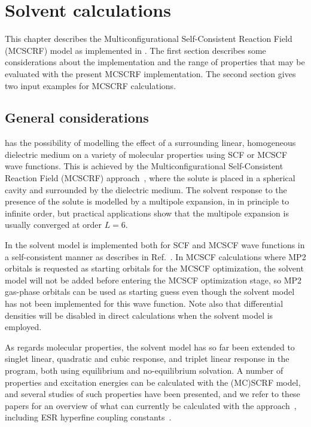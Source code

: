 \chapter{Solvent calculations}\label{ch:solvent}

This chapter describes the 
Multiconfigurational Self-Consistent Reaction Field (MCSCRF) model
as implemented in {\dalton}. The first section describes some
considerations about the implementation  and the range of
properties that may be evaluated with the present MCSCRF
implementation. The second section gives two input examples for
MCSCRF calculations.

\section{General considerations}\label{sec:solventimpl}

{\dalton} has the possibility of modelling the effect of a
surrounding linear, homogeneous dielectric
medium on a variety of molecular properties using
SCF or MCSCF
wave functions. This is achieved by the Multiconfigurational
Self-Consistent Reaction Field
(MCSCRF)
approach~\cite{kvmedpsjpc91,kvmhahjajthjcp89}, where the solute is
placed in a spherical cavity and surrounded by the
dielectric medium. The solvent response to the presence of the
solute is modelled by a multipole 
expansion, in {\dalton} in principle to infinite order, but
practical applications show that the multipole expansion is
usually converged at order $L=6$.

In {\dalton} the solvent model is implemented both for SCF and MCSCF wave
functions in a self-consistent manner as describes in
Ref.~\cite{kvmedpsjpc91,kvmhahjajthjcp89}. In MCSCF calculations where
MP2 orbitals is requested as starting orbitals for the MCSCF
optimization, the solvent model will not be added before entering the
MCSCF optimization stage, so MP2 gas-phase orbitals can be used as
starting guess even though the solvent model has not been implemented
for this wave function. Note also that differential densities will be
disabled in direct calculations when the solvent model is employed.

As regards molecular properties, the solvent model has so far been
extended to singlet linear, quadratic and cubic response, and  triplet
linear response
in the {\resp} program, both using equilibrium and no-equilibrium
solvation. A number of properties and excitation energies can
be calculated with the (MC)SCRF model, and several studies of such
properties have been presented, and we refer to these papers for an
overview of what can currently be calculated with the
approach~\cite{kvmpjhjajjcp100,kvmylhapjjcp100}, including ESR
hyperfine coupling
constants~\cite{bfocobpjkvmjcp104}.

